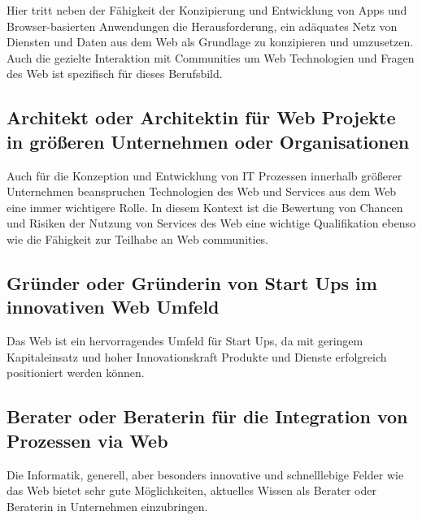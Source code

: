 Hier tritt neben der Fähigkeit der Konzipierung und Entwicklung von Apps
und Browser-basierten Anwendungen die Herausforderung, ein adäquates
Netz von Diensten und Daten aus dem Web als Grundlage zu konzipieren und
umzusetzen. Auch die gezielte Interaktion mit Communities um Web
Technologien und Fragen des Web ist spezifisch für dieses Berufsbild.

\subsection*{Architekt oder Architektin für Web Projekte in größeren
Unternehmen oder
Organisationen\label{/mi-2017/modulbeschreibungen-master/schwerpunkt-weaving-the-web}}\label{architekt-oder-architektin-fuxfcr-web-projekte-in-gruxf6uxdferen-unternehmen-oder-organisationenpathlabelmi-2017modulbeschreibungen-masterschwerpunkt-weaving-the-web}

Auch für die Konzeption und Entwicklung von IT Prozessen innerhalb
größerer Unternehmen beanspruchen Technologien des Web und Services aus
dem Web eine immer wichtigere Rolle. In diesem Kontext ist die Bewertung
von Chancen und Risiken der Nutzung von Services des Web eine wichtige
Qualifikation ebenso wie die Fähigkeit zur Teilhabe an Web communities.

\subsection*{Gründer oder Gründerin von Start Ups im innovativen Web
Umfeld\label{/mi-2017/modulbeschreibungen-master/schwerpunkt-weaving-the-web}}\label{gruxfcnder-oder-gruxfcnderin-von-start-ups-im-innovativen-web-umfeldpathlabelmi-2017modulbeschreibungen-masterschwerpunkt-weaving-the-web}

Das Web ist ein hervorragendes Umfeld für Start Ups, da mit geringem
Kapitaleinsatz und hoher Innovationskraft Produkte und Dienste
erfolgreich positioniert werden können.

\subsection*{Berater oder Beraterin für die Integration von Prozessen
via
Web\label{/mi-2017/modulbeschreibungen-master/schwerpunkt-weaving-the-web}}\label{berater-oder-beraterin-fuxfcr-die-integration-von-prozessen-via-webpathlabelmi-2017modulbeschreibungen-masterschwerpunkt-weaving-the-web}

Die Informatik, generell, aber besonders innovative und schnelllebige
Felder wie das Web bietet sehr gute Möglichkeiten, aktuelles Wissen als
Berater oder Beraterin in Unternehmen einzubringen.

